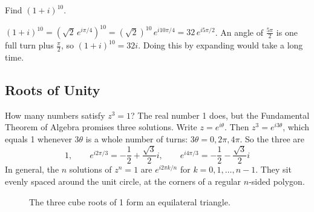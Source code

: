 \begin{Worked}
\begin{Problem}
Find $(1 + i)^{10}$.
\end{Problem}
\begin{Solution}
$(1 + i)^{10} = \left(\sqrt{2}\,e^{i\pi/4}\right)^{10} = (\sqrt{2})^{10}\, e^{i10\pi/4} = 32\, e^{i5\pi/2}$.
An angle of $\frac{5\pi}{2}$ is one full turn plus $\frac{\pi}{2}$, so
$(1 + i)^{10} = 32i$. Doing this by expanding would take a long time.
\end{Solution}
\end{Worked}

\subsection{Roots of Unity}
How many numbers satisfy $z^3 = 1$? The real number 1 does, but the Fundamental
Theorem of Algebra promises three solutions. Write $z = e^{i\theta}$. Then
$z^3 = e^{i3\theta}$, which equals 1 whenever $3\theta$ is a whole number of turns:
$3\theta = 0, 2\pi, 4\pi$. So the three  are
$$1, \qquad e^{i2\pi/3} = -\frac{1}{2} + \frac{\sqrt{3}}{2}i, \qquad e^{i4\pi/3} = -\frac{1}{2} - \frac{\sqrt{3}}{2}i$$
In general, the $n$ solutions of $z^n = 1$ are $e^{i2\pi k/n}$ for $k = 0, 1, \dots, n-1$.
They sit evenly spaced around the unit circle, at the corners of a regular
$n$-sided polygon.

\begin{figure}[H]
\centering
{}
\caption{The three cube roots of 1 form an equilateral triangle.}
\label{fig:cube-roots}
\end{figure}

